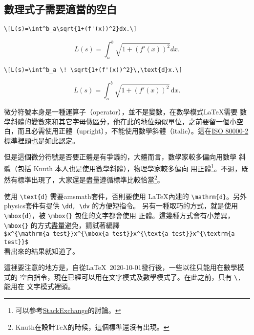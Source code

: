 \subsection{數理式子需要適當的空白}

\begin{Wrong}
\begin{verbatim}
\[L(s)=\int^b_a\sqrt{1+(f'(x))^2}dx.\]
\end{verbatim}
\[L(s)=\int^b_a\sqrt{1+(f'(x))^2}dx.\]
\end{Wrong}

\begin{Right}
\begin{verbatim}
\[L(s)=\int^b_a \! \sqrt{1+(f'(x))^2}\,\text{d}x.\]
\end{verbatim}
\[L(s)=\int^b_a \! \sqrt{1+(f'(x))^2} \, \text{d}x.\]
\end{Right}

微分符號本身是一種運算子（operator），並不是變數，在數學模式\LaTeX 需要
數學斜體的變數來和其它字母做區分，他在此的地位類似單位，之前要留一個小空
白，而且必需使用正體（upright），不能使用數學斜體（italic）。這在\href{https://saso.gov.sa/ar/mediacenter/public_multimedia/Documents/SASO-ISO-800000-2-2020-E.pdf}{ISO 80000-2}標準裡頭也是如此認定。

但是這個微分符號是否要正體是有爭議的，大體而言，數學家較多偏向用數學
斜體（包括 Knuth 本人也是使用數學斜體），物理學家較多偏向
用正體\footnote{可以參考\href{https://tex.stackexchange.com/questions/14821/whats-the-proper-way-to-typeset-a-differential-operator}{\sf StackExchange}的討論。}。不過，既然有標準出現了，大家還是盡量遵循標準比較恰當\footnote{Knuth在設計\TeX 的時候，這個標準還沒有出現。}。

使用 \verb|\text{d}| 需要{\sf amsmath}套件，否則要使用 \LaTeX 內建的 \verb|\mathrm{d}|。另外{\sf physics}套件有提供 \verb|\dd, \dv| 的方便短指令。
另有一種取巧的方式，就是使用 \verb|\mbox{d}|，被 \verb|\mbox{}| 包住的文字都會使用
正體。這幾種方式會有小差異，\verb|\mbox{}| 的方式盡量避免，請試著編譯\\
\verb|$x^{\mathrm{a test}}x^{\mbox{a test}}x^{\text{a test}}x^{\textrm{a test}}$|\\
看出來的結果就知道了。

這裡要注意的地方是，自從\LaTeX\ 2020-10-01發行後，一些以往只能用在數學模式的
空白指令，現在已經可以用在文字模式及數學模式了。在此之前，只有 \verb|\,| 能用在
文字模式裡頭。

\marginpar{\back}

